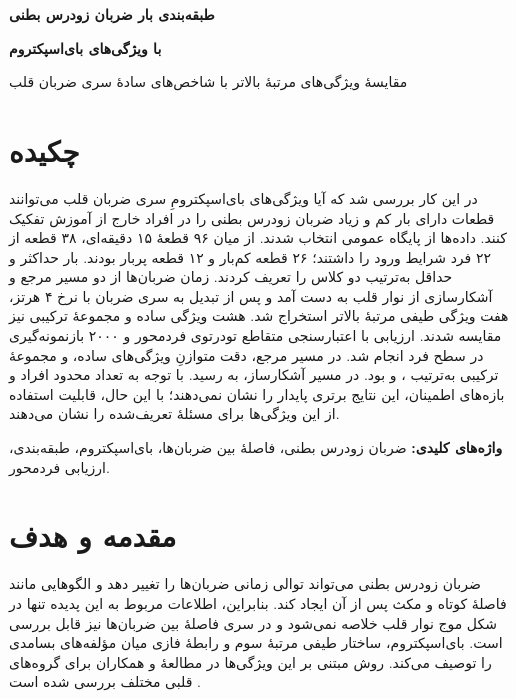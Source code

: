 \documentclass[11pt,a4paper]{article}
\newcommand{\fnum}[1]{\lr{\persianfont #1}}
\begin{document}
\fontsize{11.2}{15.1}\selectfont
\thispagestyle{plain}
\begin{center}
{\LARGE\bfseries\color{navy}طبقه‌بندی بار ضربان زودرس بطنی\par}
\vspace{2pt}
{\LARGE\bfseries\color{navy}با ویژگی‌های بای‌اسپکتروم\par}\vspace{6pt}
{\normalsize مقایسهٔ ویژگی‌های مرتبهٔ بالاتر با شاخص‌های سادهٔ سری ضربان قلب}
\end{center}
\vspace{-2mm}
\section*{چکیده}
\begingroup\small
در این کار بررسی شد که آیا ویژگی‌های بای‌اسپکترومِ سری ضربان قلب می‌توانند قطعات دارای بار کم و زیاد ضربان زودرس بطنی  را در افراد خارج از آموزش تفکیک کنند. داده‌ها از پایگاه عمومی  انتخاب شدند. از میان ۹۶ قطعهٔ ۱۵ دقیقه‌ای، ۳۸ قطعه از ۲۲ فرد شرایط ورود را داشتند؛ ۲۶ قطعه کم‌بار و ۱۲ قطعه پربار بودند. بار حداکثر \fnum{۱٪} و حداقل \fnum{۵٪} به‌ترتیب دو کلاس را تعریف کردند. زمان ضربان‌ها از دو مسیر مرجع و آشکارسازی از نوار قلب به دست آمد و پس از تبدیل به سری ضربان با نرخ ۴ هرتز، هفت ویژگی طیفی مرتبهٔ بالاتر  استخراج شد. هشت ویژگی ساده و مجموعهٔ ترکیبی نیز مقایسه شدند. ارزیابی با اعتبارسنجی متقاطع تو‌در‌توی فردمحور و ۲۰۰۰ بازنمونه‌گیری در سطح فرد انجام شد. در مسیر مرجع، دقت متوازنِ ویژگی‌های ساده،  و مجموعهٔ ترکیبی به‌ترتیب \fnum{۹۵٫۸۳}، \fnum{۸۹٫۷۴} و \fnum{۹۳٫۹۱٪} بود. در مسیر آشکارساز،  به \fnum{۹۶٫۱۵٪} رسید. با توجه به تعداد محدود افراد و بازه‌های اطمینان، این نتایج برتری پایدار  را نشان نمی‌دهند؛ با این حال، قابلیت استفاده از این ویژگی‌ها برای مسئلهٔ تعریف‌شده را نشان می‌دهند.
\par\endgroup
\textbf{واژه‌های کلیدی:} ضربان زودرس بطنی، فاصلهٔ بین ضربان‌ها، بای‌اسپکتروم، طبقه‌بندی، ارزیابی فردمحور.
\section{مقدمه و هدف}
ضربان زودرس بطنی می‌تواند توالی زمانی ضربان‌ها را تغییر دهد و الگوهایی مانند فاصلهٔ کوتاه و مکث پس از آن ایجاد کند. بنابراین، اطلاعات مربوط به این پدیده تنها در شکل موج نوار قلب خلاصه نمی‌شود و در سری فاصلهٔ بین ضربان‌ها نیز قابل بررسی است. بای‌اسپکتروم، ساختار طیفی مرتبهٔ سوم و رابطهٔ فازی میان مؤلفه‌های بسامدی را توصیف می‌کند. روش مبتنی بر این ویژگی‌ها در مطالعهٔ  و همکاران برای گروه‌های قلبی مختلف بررسی شده است \cite{chua}.
\end{document}
